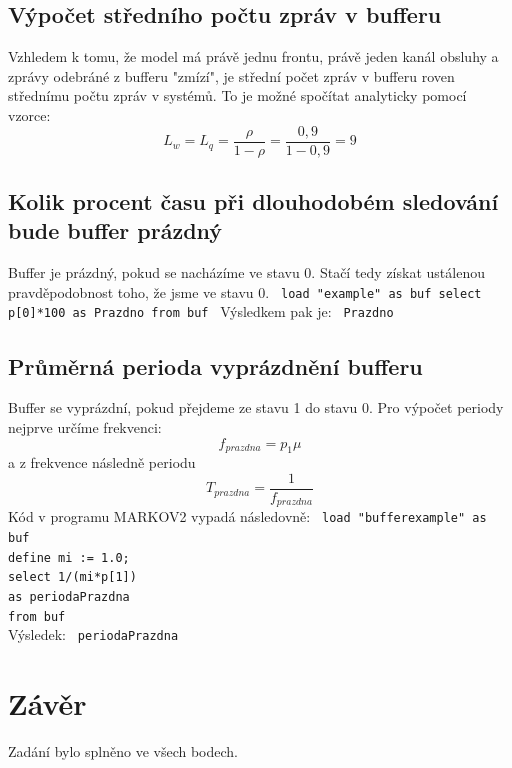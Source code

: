 \documentclass{article}
\begin{document}
\subsection{Výpočet středního počtu zpráv v bufferu}
Vzhledem k tomu, že model má právě jednu frontu, právě jeden kanál obsluhy a zprávy odebráné z bufferu "zmízí", je střední počet zpráv v bufferu roven střednímu počtu zpráv v systémů.
To je možné spočítat analyticky pomocí vzorce:
$$
	L_w = L_q = \frac{\rho}{1 - \rho} = \frac{0,9}{1 - 0,9}=9
$$
\newpage
\subsection{Kolik procent času při dlouhodobém sledování bude buffer prázdný}
Buffer je prázdný, pokud se nacházíme ve stavu 0. Stačí tedy získat ustálenou pravděpodobnost toho, že jsme ve stavu 0.\newline
\newline
\texttt
{
load "example" as buf\newline
select p{[0]}*100 \newline
as Prazdno from buf\newline
}
\newline
Výsledkem pak je:
\texttt
\newline
\texttt{
Prazdno 
}
\subsection{Průměrná perioda vyprázdnění bufferu}
Buffer se vyprázdní, pokud přejdeme ze stavu 1 do stavu 0. Pro výpočet periody nejprve určíme frekvenci:
$$
f_{prazdna} = p_1\mu
$$
a z frekvence následně periodu
$$
T_{prazdna} = \frac{1}{f_{prazdna}}
$$
\newline
Kód v programu MARKOV2 vypadá následovně:
\newline
\newline
\texttt
{
load "bufferexample" as buf\\
define mi := 1.0;\\
select 1/(mi*p{[1]})\\
as periodaPrazdna \\
from buf\\
}
\newline
Výsledek:
\newline
\newline
\texttt
{
periodaPrazdna
}






\section{Závěr} %
Zadání bylo splněno ve všech bodech.
\end{document}
